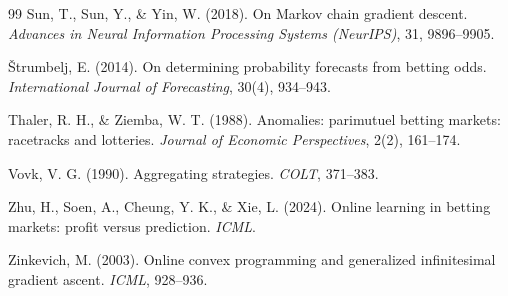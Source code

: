 \documentclass[12pt,a4paper,oneside]{report}
\renewcommand{\_}{\oldunderscore\allowbreak}
\theoremstyle{definition}
\theoremstyle{plain}
\theoremstyle{definition}   %
\begin{document}
\begin{thebibliography}{99}
 Sun, T., Sun, Y., \& Yin, W. (2018). On Markov chain gradient descent.
\emph{Advances in Neural Information Processing Systems (NeurIPS)}, 31, 9896--9905.

 Štrumbelj, E. (2014). On determining probability forecasts from
betting odds. \emph{International Journal of Forecasting}, 30(4), 934--943.

 Thaler, R. H., \& Ziemba, W. T. (1988). Anomalies: parimutuel
betting markets: racetracks and lotteries. \emph{Journal of Economic Perspectives}, 2(2),
161--174.

 Vovk, V. G. (1990). Aggregating strategies. \emph{COLT}, 371--383.

 Zhu, H., Soen, A., Cheung, Y. K., \& Xie, L. (2024). Online learning in
betting markets: profit versus prediction. \emph{ICML}.

 Zinkevich, M. (2003). Online convex programming and generalized
infinitesimal gradient ascent. \emph{ICML}, 928--936.

\end{thebibliography}
\end{document}
